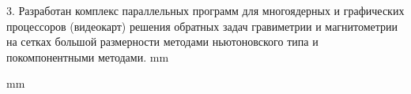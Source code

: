 \documentclass[%
autoref,     %
href,        %
facsimile,   %
colorlinks,  %
]{disser}
\begin{document}
3. Разработан комплекс параллельных программ для многоядерных и графических процессоров (видеокарт) решения обратных задач гравиметрии и магнитометрии на сетках большой размерности методами ньютоновского типа и покомпонентными методами. 
 mm

\begingroup
\let\clearpage\relax
\printbibheading[title={Основные публикации по теме диссертации}]
 mm
\printbibliography[
heading=subbibliography,
keyword=hac,
title={Статьи в изданиях из перечня ВАК, SCOPUS}
]
\endgroup

\printbibliography[
heading=subbibliography,
keyword=nohac,
title={Другие публикации}
]


\end{document}
